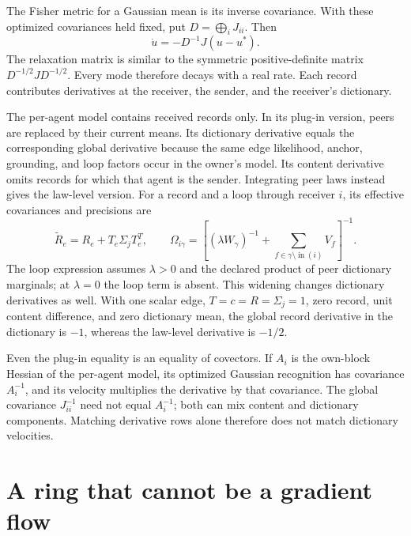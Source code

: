 The Fisher metric for a Gaussian mean is its inverse covariance. With these optimized covariances held fixed, put $D=\bigoplus_iJ_{ii}$. Then
\begin{equation}
 \dot u=-D^{-1}J(u-u^*).
 \label{c18:global-flow}
\end{equation}
The relaxation matrix is similar to the symmetric positive-definite matrix $D^{-1/2}JD^{-1/2}$. Every mode therefore decays with a real rate. Each record contributes derivatives at the receiver, the sender, and the receiver's dictionary.

The per-agent model contains received records only. In its plug-in version, peers are replaced by their current means. Its dictionary derivative equals the corresponding global derivative because the same edge likelihood, anchor, grounding, and loop factors occur in the owner's model. Its content derivative omits records for which that agent is the sender. Integrating peer laws instead gives the law-level version. For a record and a loop through receiver $i$, its effective covariances and precisions are
\begin{equation}
 \widetilde R_e=R_e+T_e\Sigma_jT_e^T,
 \qquad
 \Omega_{i\gamma}=\left[(\lambda W_\gamma)^{-1}
       +\sum_{f\in\gamma\setminus\operatorname{in}(i)}V_f\right]^{-1}.
 \label{c18:widening}
\end{equation}
The loop expression assumes $\lambda>0$ and the declared product of peer dictionary marginals; at $\lambda=0$ the loop term is absent. This widening changes dictionary derivatives as well. With one scalar edge, $T=c=R=\Sigma_j=1$, zero record, unit content difference, and zero dictionary mean, the global record derivative in the dictionary is $-1$, whereas the law-level derivative is $-1/2$.

Even the plug-in equality is an equality of covectors. If $A_i$ is the own-block Hessian of the per-agent model, its optimized Gaussian recognition has covariance $A_i^{-1}$, and its velocity multiplies the derivative by that covariance. The global covariance $J_{ii}^{-1}$ need not equal $A_i^{-1}$; both can mix content and dictionary components. Matching derivative rows alone therefore does not match dictionary velocities.

\section{A ring that cannot be a gradient flow}

